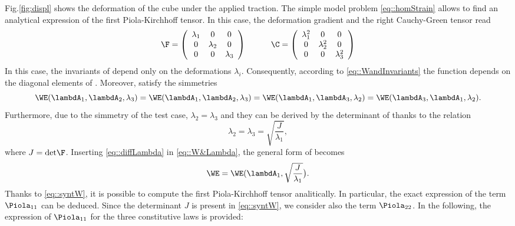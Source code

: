 Fig.\ref{fig:displ} shows the deformation of the cube under the
applied traction. The simple model problem \eqref{eq::homStrain}
allows to find an analytical expression of the first Piola-Kirchhoff
tensor. In this case, the deformation gradient \F{} and the right
Cauchy-Green tensor \C{} read
\begin{equation} \F = \left(
    \begin{array}{ccc} \lambda_1 & 0 & 0 \\ 0 & \lambda_2 & 0 \\ 0 & 0 &
      \lambda_3
    \end{array}\right)\qquad\quad \C = \left(
    \begin{array}{ccc} \lambda_1^2 & 0 & 0 \\ 0 & \lambda_2^2 & 0 \\ 0 &
      0 & \lambda_3^2
    \end{array}\right)
\end{equation}
In this case, the invariants of \C{} depend only on the
deformations $\lambda_i$. Consequently, according to
\eqref{eq::WandInvariants} the function \W{} depends on the diagonal
elements of \F{}. Moreover, \W{} satisfy the simmetries
\begin{equation}
  \WE(\lambdA_1,\lambdA_2,\lambda_3)=\WE(\lambdA_1,\lambdA_2,\lambda_3) =
  \WE(\lambdA_1,\lambdA_3,\lambda_2)=\WE(\lambdA_3,\lambdA_1,\lambda_2).
  \label{eq::W&Lambda}
\end{equation}
Furthermore, due to the simmetry of the test case,
$\lambda_2=\lambda_3$ and they can be derived by the determinant of \F{}
thanks to the relation
\begin{equation} \displaystyle
  \lambda_2=\lambda_3=\sqrt{\frac{J}{\lambda_1}},
  \label{eq::diffLambda}
\end{equation}
where $J=\text{det}\F$. Inserting
\eqref{eq::diffLambda} in \eqref{eq::W&Lambda}, the general form of \W{}
becomes
\begin{equation} \displaystyle
  \WE=\WE(\lambdA_1,\sqrt{\frac{J}{\lambda_1}}\big).
  \label{eq::syntW}
\end{equation}
Thanks to \eqref{eq::syntW}, it is possible to compute
the first Piola-Kirchhoff tensor analitically. In particular, the
exact expression of the term $\Piola_{11}$ can be deduced. Since the
determinant $J$ is present in \eqref{eq::syntW}, we consider also the
term $\Piola_{22}$. In the following, the expression of $\Piola_{11}$
for the three constitutive laws is provided:
